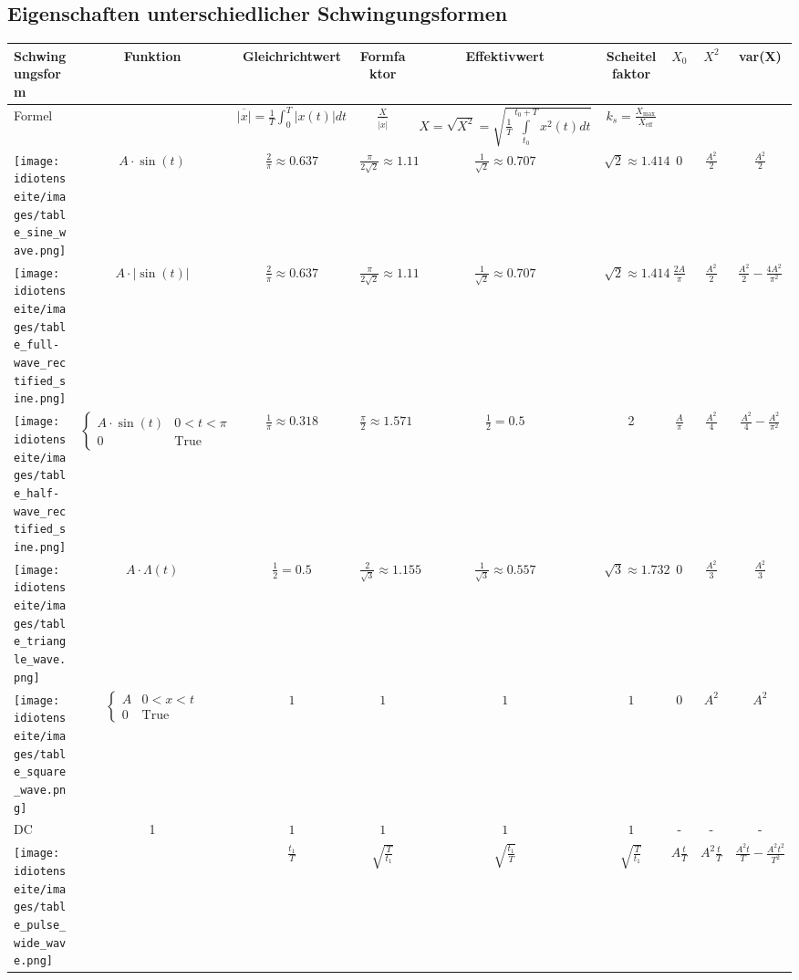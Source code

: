 \begin{sidewaystable}
\subsection{Eigenschaften unterschiedlicher Schwingungsformen}
\begin{center}
\begin{tabular}{|l|c|c|c|c|c|c|c|c|}
\hline
	Schwingungsform & Funktion & Gleichrichtwert & Formfaktor &
	Effektivwert & Scheitelfaktor & \textbf{$X_0$} & \textbf{$X^2$} & \textbf{var(X)} \\
\hline
	Formel &
	&
	$\overline{\left|x\right|} = \frac1T\int_{0}^{T}\left| x(t)\right|dt$&
	$\frac{X}{\overline{\left|x\right|}}$&
	$X = \sqrt{X^2} = \sqrt{\frac{1}{T} \int\limits ^{t_0+T}_{t_0}{x^2(t)dt}}$&
	$k_{s}=\frac{X_{\mathrm{max}}}{X_{\mathrm{eff}}}$&
	&
	&
	\\
\hline
	\texttt{[image: idiotenseite/images/table\_sine\_wave.png]} &
	$A\cdot\sin(t)$ &
	$\frac{2}{\pi} \approx 0.637$ &
	$\frac{\pi}{2\sqrt{2}} \approx 1.11$ &
	$\frac{1}{\sqrt{2}}\approx 0.707$ &
	$\sqrt{2}\approx 1.414$ &
	$0$ &
	$\frac{A^2}{2}$ &
	$\frac{A^2}{2}$ \\
\hline	
	\texttt{[image: idiotenseite/images/table\_full-wave\_rectified\_sine.png]} &
	$A\cdot|\sin(t)|$ &
	$\frac{2}{\pi} \approx 0.637$ &
	$\frac{\pi}{2\sqrt{2}} \approx 1.11$ &
	$\frac{1}{\sqrt{2}} \approx 0.707$ &
	$\sqrt{2} \approx 1.414$  &
	$\frac{2A}{\pi}$ & $\frac{A^2}{2}$ & $\frac{A^2}{2}-\frac{4A^2}{\pi^2}$
	\\
\hline
	\texttt{[image: idiotenseite/images/table\_half-wave\_rectified\_sine.png]} &
	$\begin{cases} A\cdot\sin (t) & 0<t<\pi  \\ 0 & \text{True}\end{cases}$ &
	$\frac{1}{\pi}\approx 0.318$ &
	$\frac{\pi}{2}\approx 1.571$ &
	$\frac{1}{2} = 0.5$	&
	2  &
	$\frac{A}{\pi}$ &
	$\frac{A^2}{4}$ & $\frac{A^2}{4}-\frac{A^2}{\pi^2}$
	\\
\hline
	\texttt{[image: idiotenseite/images/table\_triangle\_wave.png]} &
	$A\cdot\Lambda(t)$ &
	$\frac{1}{2}= 0.5$ &
	$\frac{2}{\sqrt{3}}\approx 1.155$ &
	$\frac{1}{\sqrt{3}}
	\approx 0.557$ &
	$\sqrt{3} \approx 1.732$ &
	$0$ &
	$\frac{A^2}{3}$ &
	$\frac{A^2}{3}$ \\
\hline	
	\texttt{[image: idiotenseite/images/table\_square\_wave.png]} &
	$\begin{cases} A & 0<x<t \\ 0 & \text{True}\end{cases}$ &
	$1$ &
	$1$ &
	$1$ &
	$1$ &
	$0$ &
	$A^2$ &
	$A^2$ \\
\hline	
	DC&
	1&
	$1$ &
	$1$ &
	$1$ &
	$1$  &
	-&
	-&
	-\\
\hline	
	\texttt{[image: idiotenseite/images/table\_pulse\_wide\_wave.png]} &
	&
	$\frac{t_1}{T}$ & $\sqrt{\frac{T}{t_1}}$ & $\sqrt{\frac{t_1}{T}}$ & $\sqrt{\frac{T}{t_1}}$ &
	$A\frac{t}{T}$ &
	$A^2\frac{t}{T}$ &
	$\frac{A^2t}{T}-\frac{A^2t^2}{T^2}$\\
\hline
\end{tabular}
\end{center}
\end{sidewaystable}

